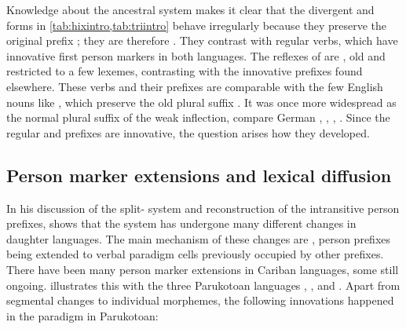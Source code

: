 Knowledge about the ancestral system makes it clear that the divergent \hixka and \trio forms in \cref{tab:hixintro,tab:triintro} behave irregularly because they preserve the original \PC {} prefix ; they are therefore .
They contrast with regular  verbs, which have innovative first person markers in both languages.
The reflexes of  are , old and restricted to a few lexemes, contrasting with the innovative prefixes found elsewhere.
These verbs and their prefixes are comparable with the few English nouns like , which preserve the old plural suffix .
It was once more widespread as the normal plural suffix of the weak inflection, compare German  ,  ,  ,  .
Since the regular \hixka and \trio prefixes are innovative, the question arises how they developed.


%

\subsection{Person marker extensions and lexical diffusion}
\label{sec:extensions_intro}
In his discussion of the \PC split- system  and reconstruction of the intransitive person prefixes, \textcite[88--96]{gildea1998} shows that the system has undergone many different changes in daughter languages.
The main mechanism of these changes are , person prefixes being extended to verbal paradigm cells previously occupied by other prefixes.
There have been many person marker extensions in Cariban languages, some still ongoing.
\textcite{gildea1998} illustrates this with the three Parukotoan languages \kaxui, \hixka, and \waiwai.
Apart from segmental changes to individual morphemes, the following innovations happened in the \setone paradigm in Parukotoan:

